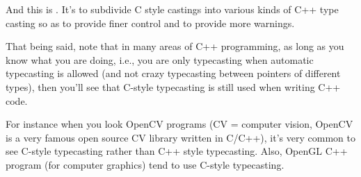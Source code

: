 And this is . It's to subdivide C style castings into various kinds of C++ type casting so as to provide finer control and to provide more warnings.

That being said, note that in many areas of C++ programming, as long as you know what you are doing, i.e., you are only typecasting when automatic typecasting is allowed (and not crazy typecasting between pointers of different types), then you'll see that C-style typecasting is still used when writing C++ code.

For instance when you look OpenCV programs (CV = computer vision, OpenCV is a very famous open source CV library written in C/C++), it's very common to see C-style typecasting rather than C++ style typecasting. Also, OpenGL C++ program (for computer graphics) tend to use C-style typecasting.

